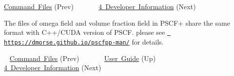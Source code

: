 \mbox{\hyperlink{user_command_page}{Command Files}} (Prev) ~ ~ ~ ~ \mbox{\hyperlink{developer_page}{4 Developer Information}} (Next) ~\newline


The files of omega field and volume fraction field in P\+S\+C\+F+ share the same format with C++/\+C\+U\+DA version of P\+S\+CF. please see \href{https://dmorse.github.io/pscfpp-man/}{\texttt{ https\+://dmorse.\+github.\+io/pscfpp-\/man/}} for details.

~\newline
 \mbox{\hyperlink{user_command_page}{Command Files}} (Prev) ~ ~ ~ ~ \mbox{\hyperlink{user_page}{User Guide}} (Up) ~ ~ ~ ~ \mbox{\hyperlink{developer_page}{4 Developer Information}} (Next) 